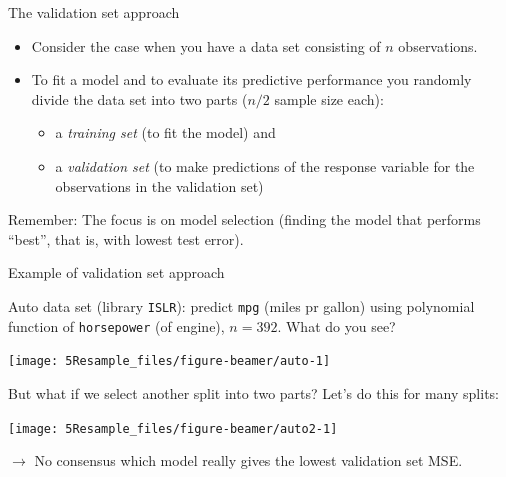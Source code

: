 \documentclass[10pt,ignorenonframetext,]{beamer}
\providecommand{\tightlist}{%
  \setlength{\itemsep}{0pt}\setlength{\parskip}{0pt}}
\begin{document}
\begin{frame}

\begin{block}{The validation set approach}

\vspace{2mm}

\begin{itemize}
\item
  Consider the case when you have a data set consisting of \(n\)
  observations.
\item
  To fit a model and to evaluate its predictive performance you randomly
  divide the data set into two parts (\(n/2\) sample size each):

  \begin{itemize}
  \tightlist
  \item
    a \emph{training set} (to fit the model) and
  \item
    a \emph{validation set} (to make predictions of the response
    variable for the observations in the validation set)
  \end{itemize}
\end{itemize}

\vspace{4mm}

Remember: The focus is on model selection (finding the model that
performs ``best'', that is, with lowest test error).

\end{block}

\end{frame}

\begin{frame}[fragile]

\begin{block}{Example of validation set approach}

\vspace{2mm}

Auto data set (library \texttt{ISLR}): predict \texttt{mpg} (miles pr
gallon) using polynomial function of \texttt{horsepower} (of engine),
\(n=392\). What do you see?

\begin{center}\texttt{[image: 5Resample\_files/figure-beamer/auto-1]} \end{center}

\end{block}

\end{frame}

\begin{frame}

But what if we select another split into two parts? Let's do this for
many splits:

\begin{center}\texttt{[image: 5Resample\_files/figure-beamer/auto2-1]} \end{center}

\(\rightarrow\) No consensus which model really gives the lowest
validation set MSE.

\end{frame}
\end{document}
